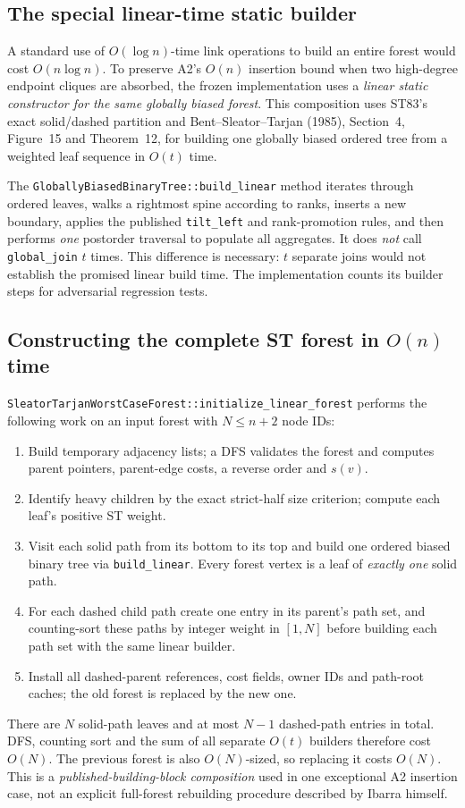 \subsection{The special linear-time static builder}
A standard use of \(O(\log n)\)-time link operations to build an entire forest would cost \(O(n\log n)\).  To preserve A2's \(O(n)\) insertion bound when two high-degree endpoint cliques are absorbed, the frozen implementation uses a \emph{linear static constructor for the same globally biased forest}.  This composition uses ST83's exact solid/dashed partition and Bent--Sleator--Tarjan (1985), Section~4, Figure~15 and Theorem~12, for building one globally biased ordered tree from a weighted leaf sequence in \(O(t)\) time.

The \texttt{GloballyBiasedBinaryTree::build\_linear} method iterates through ordered leaves, walks a rightmost spine according to ranks, inserts a new boundary, applies the published \texttt{tilt\_left} and rank-promotion rules, and then performs \emph{one} postorder traversal to populate all aggregates.  It does \emph{not} call \texttt{global\_join} \(t\) times.  This difference is necessary: \(t\) separate joins would not establish the promised linear build time.  The implementation counts its builder steps for adversarial regression tests.

\subsection{Constructing the complete ST forest in \(O(n)\) time}
\texttt{SleatorTarjanWorstCaseForest::initialize\_linear\_forest} performs the following work on an input forest with \(N\le n+2\) node IDs:
\begin{enumerate}[leftmargin=*]
\item Build temporary adjacency lists; a DFS validates the forest and computes parent pointers, parent-edge costs, a reverse order and \(s(v)\).
\item Identify heavy children by the exact strict-half size criterion; compute each leaf's positive ST weight.
\item Visit each solid path from its bottom to its top and build one ordered biased binary tree via \texttt{build\_linear}.  Every forest vertex is a leaf of \emph{exactly one} solid path.
\item For each dashed child path create one entry in its parent's path set, and counting-sort these paths by integer weight in \([1,N]\) before building each path set with the same linear builder.
\item Install all dashed-parent references, cost fields, owner IDs and path-root caches; the old forest is replaced by the new one.
\end{enumerate}
There are \(N\) solid-path leaves and at most \(N-1\) dashed-path entries in total.  DFS, counting sort and the sum of all separate \(O(t)\) builders therefore cost \(O(N)\).  The previous forest is also \(O(N)\)-sized, so replacing it costs \(O(N)\).  This is a \emph{published-building-block composition} used in one exceptional A2 insertion case, not an explicit full-forest rebuilding procedure described by Ibarra himself.

